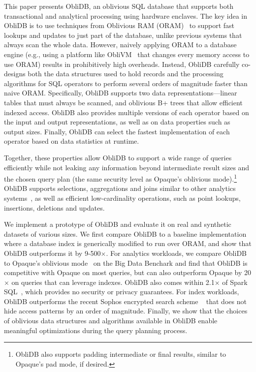 \documentclass[letterpaper,twocolumn,10pt]{article}
\def\name/{ObliDB}
\begin{document}
This paper presents \name/, an oblivious SQL database that supports both transactional and analytical processing using hardware enclaves.
The key idea in \name/ is to use techniques from Oblivious RAM (ORAM)~\cite{SDS+13} to support fast lookups and updates to just part of the database, unlike previous systems that always scan the whole data.
However, naively applying ORAM to a database engine (e.g., using a platform like ObliVM~\cite{oblivm} that changes every memory access to use ORAM) results in prohibitively high overheads.
Instead, \name/ carefully co-designs both the data structures used to hold records and the processing algorithms for SQL operators to perform several orders of magnitude faster than naive ORAM.
Specifically, \name/ supports two data representations---linear tables that must always be scanned, and oblivious B+ trees that allow efficient indexed access.
\name/ also provides multiple versions of each operator based on the input and output representations, as well as on data properties such as output sizes.
Finally, \name/ can select the fastest implementation of each operator based on data statistics at runtime.

Together, these properties allow \name/ to support a wide range of queries efficiently while not leaking any information beyond intermediate result sizes and the chosen query plan (the same security level as Opaque's oblivious mode).\footnote{
    \name/ also supports padding intermediate or final results, similar to Opaque's pad mode, if desired.
}
\name/ supports selections, aggregations and joins similar to other analytics systems~\cite{ZDB+17,cipherbase}, as well as efficient low-cardinality operations, such as point lookups, insertions, deletions and updates.

We implement a prototype of \name/ and evaluate it on real and synthetic datasets of various sizes.
We first compare \name/ to a baseline implementation where a database index is generically modified to run over ORAM, and show that \name/ outperforms it by 9-500$\times$.
For analytics workloads, we compare \name/ to Opaque's oblivious mode~\cite{ZDB+17} on the Big Data Benchark\cite{BDB} and find that \name/ is competitive with Opaque on most queries, but can also outperform Opaque by 20$\times$ on queries that can leverage indexes.
\name/ also comes within 2.1$\times$ of Spark SQL~\cite{SparkSQL}, which provides no security or privacy guarantees.
For index workloads, \name/ outperforms the recent Sophos encrypted search scheme ~\cite{Bost16} that does not hide access patterns by an order of magnitude.
Finally, we show that the choices of oblivious data structures and algorithms available in \name/ enable meaningful optimizations during the query planning process.
\end{document}

